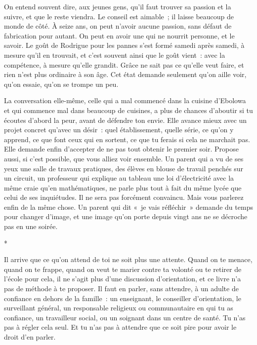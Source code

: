 \documentclass[10.5pt,twoside,openright]{book}
\newcommand{\asterisme}{\par\vspace{0.7em}\centerline{\color{gris}*\quad*\quad*}\vspace{0.7em}\par\noindent}
\newcommand{\soustitre}[1]{\par\vspace{1.1em}\noindent{\bfseries\color{accent}#1}\par\vspace{0.4em}\noindent}
\begin{document}
On entend souvent dire, aux jeunes gens, qu’il faut trouver sa passion et la suivre, et que le reste viendra. Le conseil est aimable ; il laisse beaucoup de monde de côté. À seize ans, on peut n’avoir aucune passion, sans défaut de fabrication pour autant. On peut en avoir une qui ne nourrit personne, et le savoir. Le goût de Rodrigue pour les pannes s’est formé samedi après samedi, à mesure qu’il en trouvait, et c’est souvent ainsi que le goût vient : avec la compétence, à mesure qu’elle grandit. Grâce ne sait pas ce qu’elle veut faire, et rien n’est plus ordinaire à son âge. Cet état demande seulement qu’on aille voir, qu’on essaie, qu’on se trompe un peu.

La conversation elle-même, celle qui a mal commencé dans la cuisine d’Ebolowa et qui commence mal dans beaucoup de cuisines, a plus de chances d’aboutir si tu écoutes d’abord la peur, avant de défendre ton envie. Elle avance mieux avec un projet concret qu’avec un désir : quel établissement, quelle série, ce qu’on y apprend, ce que font ceux qui en sortent, ce que tu ferais si cela ne marchait pas. Elle demande enfin d’accepter de ne pas tout obtenir le premier soir. Propose aussi, si c’est possible, que vous alliez voir ensemble. Un parent qui a vu de ses yeux une salle de travaux pratiques, des élèves en blouse de travail penchés sur un circuit, un professeur qui explique au tableau une loi d’électricité avec la même craie qu’en mathématiques, ne parle plus tout à fait du même lycée que celui de ses inquiétudes. Il ne sera pas forcément convaincu. Mais vous parlerez enfin de la même chose. Un parent qui dit « je vais réfléchir » demande du temps pour changer d’image, et une image qu’on porte depuis vingt ans ne se décroche pas en une soirée.

\asterisme

Il arrive que ce qu’on attend de toi ne soit plus une attente. Quand on te menace, quand on te frappe, quand on veut te marier contre ta volonté ou te retirer de l’école pour cela, il ne s’agit plus d’une discussion d’orientation, et ce livre n’a pas de méthode à te proposer. Il faut en parler, sans attendre, à un adulte de confiance en dehors de la famille : un enseignant, le conseiller d’orientation, le surveillant général, un responsable religieux ou communautaire en qui tu as confiance, un travailleur social, ou un soignant dans un centre de santé. Tu n’as pas à régler cela seul. Et tu n’as pas à attendre que ce soit pire pour avoir le droit d’en parler.

\soustitre{Ce soir, essaie ceci}
\end{document}
